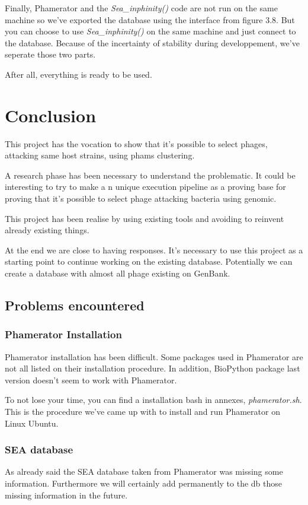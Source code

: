 \documentclass[a4paper,11pt]{report}
\begin{document}
Finally, Phamerator and the \textit{Sea\_inphinity()} code are not run on the same machine so we've exported the database using the interface from figure 3.8. But you can choose to use \textit{Sea\_inphinity()} on the same machine and just connect to the database. Because of the incertainty of stability during developpement, we've seperate those two parts.

After all, everything is ready to be used.

\chapter{Conclusion}
This project has the vocation to show that it's possible to select phages, attacking same host strains, using phams clustering.

A research phase has been necessary to understand the problematic. It could be interesting to try to make a n unique execution pipeline as a proving base for proving that it's possible to select phage attacking bacteria using genomic.

This project has been realise by using existing tools and avoiding to reinvent already existing things.

At the end we are close to having responses. It's necessary to use this project as a starting point to continue working on the existing database. Potentially we can create a database with almost all phage existing on GenBank.
\section{Problems encountered}
\subsection{Phamerator Installation}
Phamerator installation has been difficult. Some packages used in Phamerator are not all listed on their installation procedure. In addition, BioPython package last version doesn't seem to work with Phamerator.

To not lose your time, you can find a installation bash in annexes, \textit{phamerator.sh}. This is the procedure we've came up with to install and run Phamerator on Linux Ubuntu.

\subsection{SEA database}
As already said the SEA database taken from Phamerator was missing some information. Furthermore we will certainly add permanently to the db those missing information in the future.
\end{document}
